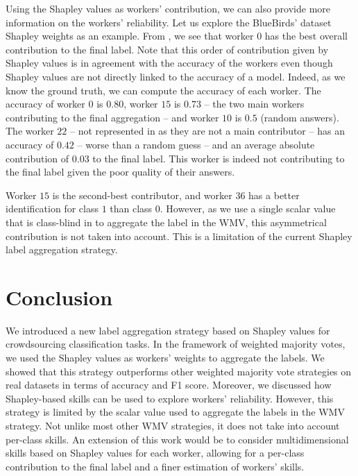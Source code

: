 \documentclass{cap2024}
\begin{document}
Using the Shapley values as workers' contribution, we can also provide more information on the workers' reliability.
Let us explore the BlueBirds' dataset Shapley weights as an example.
From , we see that worker $0$ has the best overall contribution to the final label.
Note that this order of contribution given by Shapley values is in agreement with the accuracy of the workers even though Shapley values are not directly linked to the accuracy of a model.
Indeed, as we know the ground truth, we can compute the accuracy of each worker.
The accuracy of worker $0$ is $0.80$, worker $15$ is $0.73$ -- the two main workers contributing to the final aggregation -- and worker $10$ is $0.5$ (random answers).
The worker $22$ -- not represented in  as they are not a main contributor -- has an accuracy of $0.42$ -- worse than a random guess -- and an average absolute contribution of $0.03$ to the final label. This worker is indeed not contributing to the final label given the poor quality of their answers.

Worker $15$ is the second-best contributor, and worker $36$ has a better identification for class $1$ than class $0$.
However, as we use a single scalar value that is class-blind in  to aggregate the label in the WMV, this asymmetrical contribution is not taken into account.
This is a limitation of the current Shapley label aggregation strategy.


\section{Conclusion}
\label{sec:conclusion}

We introduced a new label aggregation strategy based on Shapley values for crowdsourcing classification tasks.
In the framework of weighted majority votes, we used the Shapley values as workers' weights to aggregate the labels.
We showed that this strategy outperforms other weighted majority vote strategies on real datasets in terms of accuracy and F1 score.
Moreover, we discussed how Shapley-based skills can be used to explore workers' reliability.
However, this strategy is limited by the scalar value used to aggregate the labels in the WMV strategy.
Not unlike most other WMV strategies, it does not take into account per-class skills.
An extension of this work would be to consider multidimensional skills based on Shapley values for each worker, allowing for a per-class contribution to the final label and a finer estimation of workers' skills.



\end{document}

